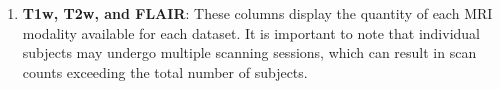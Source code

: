 \begin{enumerate}
    \item \textbf{T1w, T2w, and FLAIR}: These columns display the quantity of each MRI modality available for each dataset. 
    It is important to note that individual subjects may undergo multiple scanning sessions, which can result in scan counts exceeding the total number of subjects. 
\end{enumerate}


